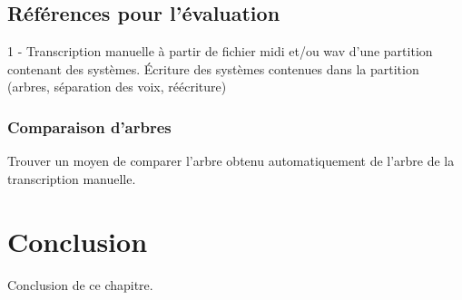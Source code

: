 \subsection*{Références pour l’évaluation}
1 - Transcription manuelle à partir de fichier midi et/ou wav d’une partition contenant des systèmes. Écriture des systèmes contenues dans la partition (arbres, séparation des voix, réécriture)
\subsubsection{Comparaison d’arbres}
Trouver un moyen de comparer l’arbre obtenu automatiquement de l’arbre de la transcription manuelle.
\section{Conclusion}
Conclusion de ce chapitre.
